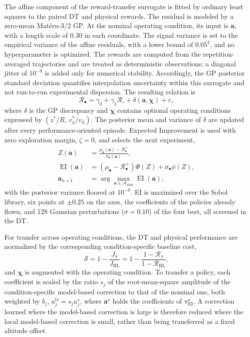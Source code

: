 \documentclass[journal]{IEEEtran}
\begin{document}
The affine component of the reward-transfer surrogate is fitted by ordinary least squares to the paired DT and physical rewards. The residual is modeled by a zero-mean Mat\'ern-$3/2$ GP. At the nominal operating condition, its input is $\mathbf a$, with a length scale of $0.30$ in each coordinate. The signal variance is set to the empirical variance of the affine residuals, with a lower bound of $0.05^2$, and no hyperparameter is optimized. The rewards are computed from the repetition-averaged trajectories and are treated as deterministic observations; a diagonal jitter of $10^{-8}$ is added only for numerical stability. Accordingly, the GP posterior standard deviation quantifies interpolation uncertainty within this surrogate and not run-to-run experimental dispersion. The resulting relation is
\begin{equation}
 \mathcal{R}_{\bullet}=
 \gamma_0+\gamma_1\mathcal{R}_{\circ}
 +\delta(\mathbf a,\boldsymbol{\chi})+\varepsilon,
 \label{eq:reward-transfer}
\end{equation}
where $\delta$ is the GP discrepancy and $\boldsymbol{\chi}$ contains optional operating conditions expressed by $(z^\ast/R,\,v_x^\ast/v_h)$. The posterior mean and variance of $\delta$ are updated after every performance-oriented episode. Expected Improvement is used with zero exploration margin, $\zeta=0$, and selects the next experiment,
\begin{align}
 Z(\mathbf a)&=
 \frac{\mu_{\bullet}(\mathbf a)-\mathcal{R}_{\bullet}^{+}}
 {\sigma_{\bullet}(\mathbf a)},\\
 \operatorname{EI}(\mathbf a)&=
 \left(\mu_{\bullet}-\mathcal{R}_{\bullet}^{+}\right)\Phi(Z)
 +\sigma_{\bullet}\phi(Z),\\
 \mathbf a_{n+1}&=
 \arg\max_{\mathbf a\in\mathcal A_{\mathrm{adm}}}
 \operatorname{EI}(\mathbf a),
 \label{eq:ei}
\end{align}
with the posterior variance floored at $10^{-8}$. EI is maximized over the Sobol library, six points at $\pm0.25$ on the axes, the coefficients of the policies already flown, and 128 Gaussian perturbations ($\sigma=0.10$) of the four best, all screened in the DT.

For transfer across operating conditions, the DT and physical performance are normalized by the corresponding condition-specific baseline cost,
\begin{equation}
 \mathcal S=1-\frac{J_{\pi}}{J_{\mathrm{BL}}}
   =1-\frac{1-\mathcal R_{\pi}}{1-\mathcal R_{\mathrm{BL}}},
 \label{eq:normalized-score}
\end{equation}
and $\boldsymbol{\chi}$ is augmented with the operating condition. To transfer a policy, each coefficient is scaled by the ratio $s_j$ of the root-mean-square amplitude of the condition-specific model-based correction to that of the nominal one, both weighted by $b_j$, $a_j^{\mathrm{tr}}=s_j a_j^{\star}$, where $\mathbf a^{\star}$ holds the coefficients of $\pi_{\mathrm{EI}}^{\star}$. A correction learned where the model-based correction is large is therefore reduced where the local model-based correction is small, rather than being transferred as a fixed altitude offset.
\end{document}
